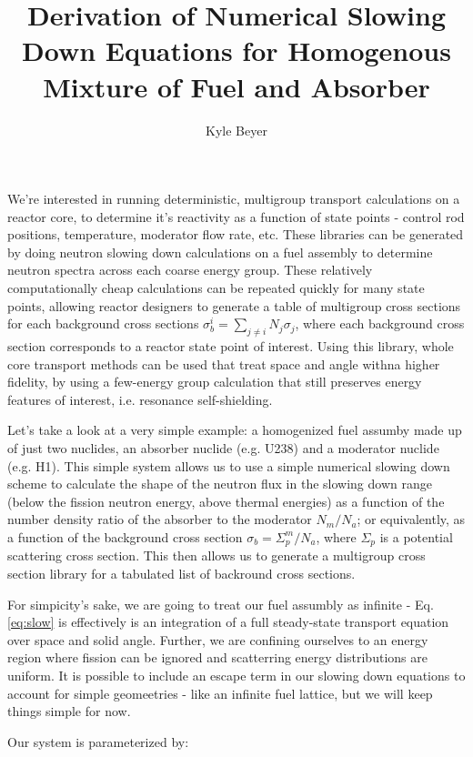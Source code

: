 \documentclass{article}
\title{Derivation of Numerical Slowing Down Equations for Homogenous Mixture of Fuel and Absorber}
\author{Kyle Beyer}
\begin{document}
\maketitle

We're interested in running deterministic, multigroup transport calculations on a reactor core, to determine
it's reactivity as a function of state points - control rod positions, temperature, moderator flow rate, etc.
These libraries can be generated by doing neutron slowing down calculations on a fuel assembly to determine 
neutron spectra across each coarse energy group.
These relatively computationally cheap calculations can be repeated quickly for many state points, 
allowing reactor designers to generate a table of  multigroup cross sections for 
each background cross sections $\sigma_b^i = \sum_{j \neq i} N_j \sigma_j$, where each 
background cross section corresponds to a reactor state point of interest.
Using this library, whole core transport methods can be used that treat space and angle withna higher fidelity,
by using a few-energy group calculation that still preserves energy features of interest, i.e. resonance self-shielding. 


Let's take a look at a very simple example: a homogenized fuel assumby made up of just 
two nuclides, an absorber nuclide (e.g. U238) and 
a moderator nuclide (e.g. H1). 
This simple system allows us to use a simple numerical slowing down scheme to calculate the shape of the neutron flux
in the slowing down range (below the fission neutron energy, above thermal energies)
as a function of the number density ratio of the absorber to the moderator $N_m/N_a$; or equivalently, as a function of the
background cross section $\sigma_b = \Sigma^m_p / N_a$, where $\Sigma_p$ is a potential scattering cross section. 
This then allows us to generate a multigroup cross section library for a tabulated list of backround cross sections.

For simpicity's sake, we are going to treat our fuel assumbly as infinite - Eq.\,\ref{eq:slow} is
effectively is an integration of a full steady-state transport equation over space and solid angle. 
Further, we are confining ourselves to an energy region where fission can be ignored and 
scatterring energy distributions are uniform.
It is possible to include an escape term in our slowing down equations to account for simple geomeetries - like 
an infinite fuel lattice, but we will keep things simple for now.

Our system is parameterized by:
\end{document}
